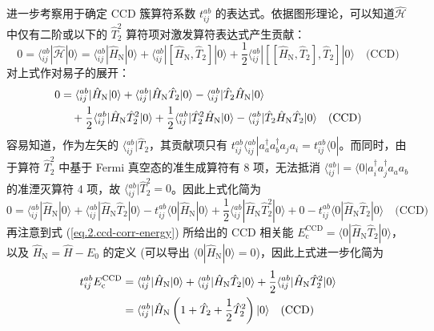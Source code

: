 进一步考察用于确定 CCD 簇算符系数 $t_{ij}^{ab}$ 的表达式。依据图形理论，可以知道$\hat{\mathcal{H}}$ 中仅有二阶或以下的 $\hat T_2^2$ 算符项对激发算符表达式产生贡献：
\begin{equation}
  \label{eq.2.ccd-amplitude-connect}
  0 = \langle {}_{ij}^{ab} | \hat{\mathcal{H}} | 0 \rangle = \langle {}_{ij}^{ab} | \hat H_\mathrm{N} | 0 \rangle + \langle {}_{ij}^{ab} | [\hat H_\mathrm{N}, \hat T_2] | 0 \rangle + \frac{1}{2} \langle {}_{ij}^{ab} | [[\hat H_\mathrm{N}, \hat T_2], \hat T_2] | 0 \rangle \quad \text{(CCD)}
\end{equation}
对上式作对易子的展开：
\begin{align}
  0 &= \langle {}_{ij}^{ab} | \hat H_\mathrm{N} | 0 \rangle + \langle {}_{ij}^{ab} | \hat H_\mathrm{N} \hat T_2 | 0 \rangle - \langle {}_{ij}^{ab} | \hat T_2 \hat H_\mathrm{N} | 0 \rangle \notag\\
  &\quad + \frac{1}{2} \langle {}_{ij}^{ab} | \hat H_\mathrm{N} \hat T_2^2 | 0 \rangle + \frac{1}{2} \langle {}_{ij}^{ab} | \hat T_2^2 \hat H_\mathrm{N} | 0 \rangle - \langle {}_{ij}^{ab} | \hat T_2 \hat H_\mathrm{N} \hat T_2 | 0 \rangle \quad \text{(CCD)}
\end{align}
容易知道，作为左矢的 $\langle {}_{ij}^{ab} | \hat T_2$，其贡献项只有 $t_{ij}^{ab} \langle {}_{ij}^{ab} | a_a^\dagger a_b^\dagger a_j a_i = t_{ij}^{ab} \langle 0 |$。而同时，由于算符 $\hat T_2^2$ 中基于 Fermi 真空态的准生成算符有 8 项，无法抵消 $\langle {}_{ij}^{ab} | = \langle 0 | a_i^\dagger a_j^\dagger a_a a_b$ 的准湮灭算符 4 项，故 $\langle {}_{ij}^{ab} | \hat T_2^2 = 0$。因此上式化简为
\begin{equation*}
  0 = \langle {}_{ij}^{ab} | \hat H_\mathrm{N} | 0 \rangle + \langle {}_{ij}^{ab} | \hat H_\mathrm{N} \hat T_2 | 0 \rangle - t_{ij}^{ab} \langle 0 | \hat H_\mathrm{N} | 0 \rangle + \frac{1}{2} \langle {}_{ij}^{ab} | \hat H_\mathrm{N} \hat T_2^2 | 0 \rangle + 0 - t_{ij}^{ab} \langle 0 | \hat H_\mathrm{N} \hat T_2 | 0 \rangle \quad \text{(CCD)}
\end{equation*}
再注意到式 (\ref{eq.2.ccd-corr-energy}) 所给出的 CCD 相关能 $E_\mathrm{c}^\mathrm{CCD} = \langle 0 | \hat H_\mathrm{N} \hat T_2 | 0 \rangle$，以及 $\hat H_\mathrm{N} = \hat H - E_0$ 的定义 (可以导出 $\langle 0 | \hat H_\mathrm{N} | 0 \rangle = 0$)，因此上式进一步化简为
\begin{align}
  \label{eq.2.ccd-amplitude}
  t_{ij}^{ab} E_\mathrm{c}^\mathrm{CCD} &= \langle {}_{ij}^{ab} | \hat H_\mathrm{N} | 0 \rangle + \langle {}_{ij}^{ab} | \hat H_\mathrm{N} \hat T_2 | 0 \rangle + \frac{1}{2} \langle {}_{ij}^{ab} | \hat H_\mathrm{N} \hat T_2^2 | 0 \rangle \notag\\
  &= \langle {}_{ij}^{ab} | \hat H_\mathrm{N} \left( 1 + \hat T_2 + \frac{1}{2} \hat T_2^2 \right) | 0 \rangle \quad \text{(CCD)}
\end{align}
